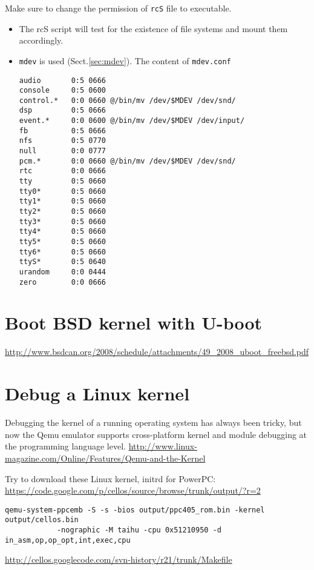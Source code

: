 Make sure to change the permission of \verb!rcS! file to executable.
\begin{itemize}
  \item The rcS script will test for the existence of file systems and mount
  them accordingly.

  \item \verb!mdev! is used (Sect.\ref{sec:mdev}). The content of
  \verb!mdev.conf!
\begin{verbatim}
audio       0:5 0666
console     0:5 0600
control.*   0:0 0660 @/bin/mv /dev/$MDEV /dev/snd/
dsp         0:5 0666
event.*     0:0 0600 @/bin/mv /dev/$MDEV /dev/input/
fb          0:5 0666
nfs         0:5 0770
null        0:0 0777
pcm.*       0:0 0660 @/bin/mv /dev/$MDEV /dev/snd/
rtc         0:0 0666
tty         0:5 0660
tty0*       0:5 0660
tty1*       0:5 0660
tty2*       0:5 0660
tty3*       0:5 0660
tty4*       0:5 0660
tty5*       0:5 0660
tty6*       0:5 0660
ttyS*       0:5 0640
urandom     0:0 0444
zero        0:0 0666
\end{verbatim}
\end{itemize}

\section{Boot BSD kernel with U-boot}


\url{http://www.bsdcan.org/2008/schedule/attachments/49_2008_uboot_freebsd.pdf}

\section{Debug a Linux kernel}

Debugging the kernel of a running operating system has always been tricky, but
now the Qemu emulator supports cross-platform kernel and module debugging at the
programming language level.
\url{http://www.linux-magazine.com/Online/Features/Qemu-and-the-Kernel}

Try to download these Linux kernel, initrd for PowerPC:
\url{https://code.google.com/p/cellos/source/browse/trunk/output/?r=2}

\begin{verbatim}
qemu-system-ppcemb -S -s -bios output/ppc405_rom.bin -kernel output/cellos.bin
            -nographic -M taihu -cpu 0x51210950 -d in_asm,op,op_opt,int,exec,cpu
\end{verbatim}
\url{http://cellos.googlecode.com/svn-history/r21/trunk/Makefile}

